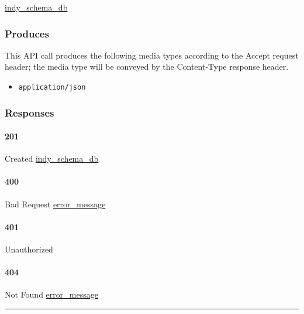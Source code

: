 \protect\hyperlink{indy_schema_db}{indy\_schema\_db}

\hypertarget{produces-73}{%
\subsubsection{Produces}\label{produces-73}}

This API call produces the following media types according to the
{Accept} request header; the media type will be conveyed by the
{Content-Type} response header.

\begin{itemize}
\tightlist
\item
  \texttt{application/json}
\end{itemize}

\hypertarget{responses-73}{%
\subsubsection{Responses}\label{responses-73}}

\hypertarget{section-242}{%
\paragraph{201}\label{section-242}}

Created \protect\hyperlink{indy_schema_db}{indy\_schema\_db}

\hypertarget{section-243}{%
\paragraph{400}\label{section-243}}

Bad Request \protect\hyperlink{error_message}{error\_message}

\hypertarget{section-244}{%
\paragraph{401}\label{section-244}}

Unauthorized \protect\hyperlink{}{}

\hypertarget{section-245}{%
\paragraph{404}\label{section-245}}

Not Found \protect\hyperlink{error_message}{error\_message}

\begin{center}\rule{0.5\linewidth}{\linethickness}\end{center}

